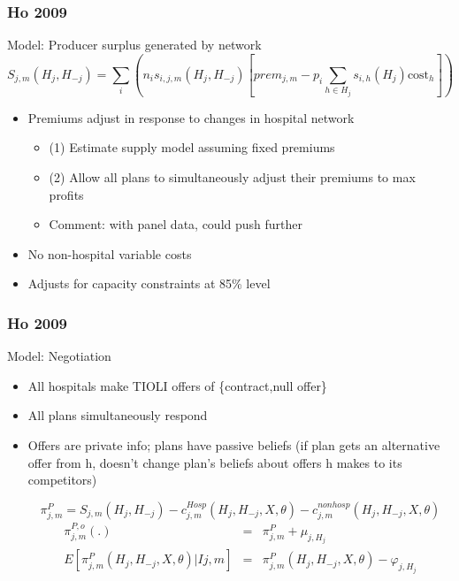 \documentclass[aspectratio=169,11pt]{beamer}
\begin{document}
\begin{frame}
\frametitle{Ho 2009}

Model: Producer surplus generated by network
\[
S_{j,m}(H_{j},H_{-j})=\sum%
\limits_{i}(n_{i}s_{i,j,m}(H_{j},H_{-j})[prem_{j,m}-p_{i}\sum \limits_{h\in
H_{j}}s_{i,h}(H_{j})\text{cost}_{h}])
\]

\begin{itemize}
\item Premiums adjust in response to changes in hospital network
\begin{itemize}
\item (1) Estimate supply model assuming fixed premiums
\item (2) Allow all plans to simultaneously adjust their premiums to max profits
\item Comment: with panel data, could push further
\end{itemize}
\item No non-hospital variable costs
\item Adjusts for capacity constraints at 85\% level

\end{itemize}

\end{frame}

\begin{frame}
\frametitle{Ho 2009}

Model: Negotiation
\begin{itemize}
\item All hospitals make TIOLI offers of \{contract,null offer\}
\item All plans simultaneously respond
\item Offers are private info; plans have passive beliefs (if plan gets an alternative offer from h, doesn't change plan's beliefs about offers h makes to its competitors)

\[
\pi _{j,m}^{P} =S_{j,m}(H_{j},H_{-j})-c_{j,m}^{Hosp}(H_{j},H_{-j},X,\theta
)-c_{j,m}^{nonhosp}(H_{j},H_{-j},X,\theta )
\]
\begin{eqnarray*}
\pi _{j,m}^{P,o}(.) &=&\pi _{j,m}^{P}+\mu _{j,H_{j}} \\
E[\pi _{j,m}^{P}(H_{j},H_{-j},X,\theta )|Ij,m] &=&\pi
_{j,m}^{P}(H_{j},H_{-j},X,\theta )-\varphi _{j,H_{j}}
\end{eqnarray*}

\end{itemize}

\end{frame}
\end{document}

